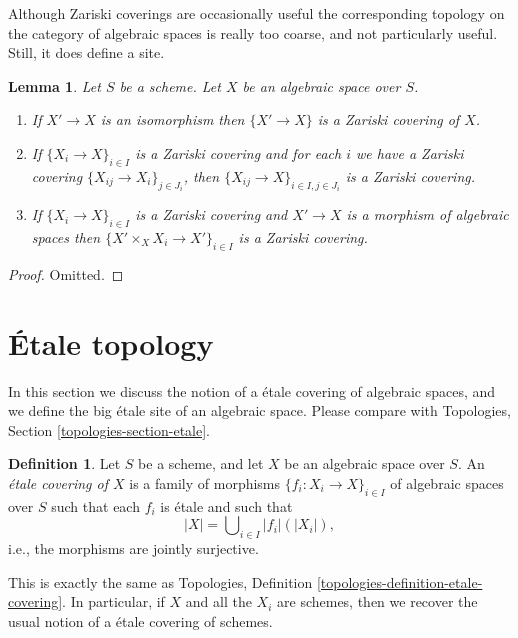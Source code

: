 \documentclass{stacks-project}
\theoremstyle{plain}
\newtheorem{lemma}[subsection]{Lemma}
\theoremstyle{definition}
\newtheorem{definition}[subsection]{Definition}
\theoremstyle{remark}
\numberwithin{equation}{subsection}
\begin{document}
\noindent
Although Zariski coverings are occasionally useful the corresponding topology
on the category of algebraic spaces is really too coarse, and not particularly
useful. Still, it does define a site.

\begin{lemma}
\label{lemma-zariski}
Let $S$ be a scheme.
Let $X$ be an algebraic space over $S$.
\begin{enumerate}
\item If $X' \to X$ is an isomorphism then $\{X' \to X\}$
is a Zariski covering of $X$.
\item If $\{X_i \to X\}_{i\in I}$ is a Zariski covering and for each
$i$ we have a Zariski covering $\{X_{ij} \to X_i\}_{j\in J_i}$, then
$\{X_{ij} \to X\}_{i \in I, j\in J_i}$ is a Zariski covering.
\item If $\{X_i \to X\}_{i\in I}$ is a Zariski covering
and $X' \to X$ is a morphism of algebraic spaces then
$\{X' \times_X X_i \to X'\}_{i\in I}$ is a Zariski covering.
\end{enumerate}
\end{lemma}

\begin{proof}
Omitted.
\end{proof}










\section{\'Etale topology}
\label{section-etale}

\noindent
In this section we discuss the notion of a \'etale covering of
algebraic spaces, and we define the big \'etale site of an
algebraic space. Please compare with
Topologies, Section \ref{topologies-section-etale}.

\begin{definition}
\label{definition-etale-covering}
Let $S$ be a scheme, and let $X$ be an algebraic space over $S$.
An {\it \'etale covering of $X$} is a family of morphisms
$\{f_i : X_i \to X\}_{i \in I}$ of algebraic spaces over $S$
such that each $f_i$ is \'etale
and such that
$$
|X| = \bigcup\nolimits_{i \in I} |f_i|(|X_i|),
$$
i.e., the morphisms are jointly surjective.
\end{definition}

\noindent
This is exactly the same as
Topologies, Definition \ref{topologies-definition-etale-covering}.
In particular, if $X$ and all the $X_i$ are schemes, then we recover the
usual notion of a \'etale covering of schemes.
\end{document}
